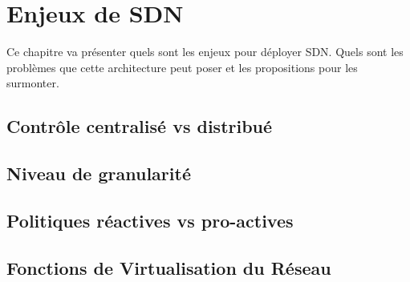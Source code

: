 \chapter{Enjeux de SDN}

Ce chapitre va présenter quels sont les enjeux pour déployer SDN. Quels sont les problèmes que cette architecture peut poser et les propositions pour les surmonter.

\section{Contrôle centralisé vs distribué}

\section{Niveau de granularité}

\section{Politiques réactives vs pro-actives}

\section{Fonctions de Virtualisation du Réseau}
